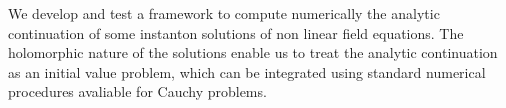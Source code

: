 We develop and test a framework to compute numerically the analytic
continuation of some instanton solutions of non linear field
equations. The holomorphic nature of the solutions enable us to treat
the analytic continuation as an initial value problem, which can be
integrated using standard numerical procedures avaliable for Cauchy
problems.
